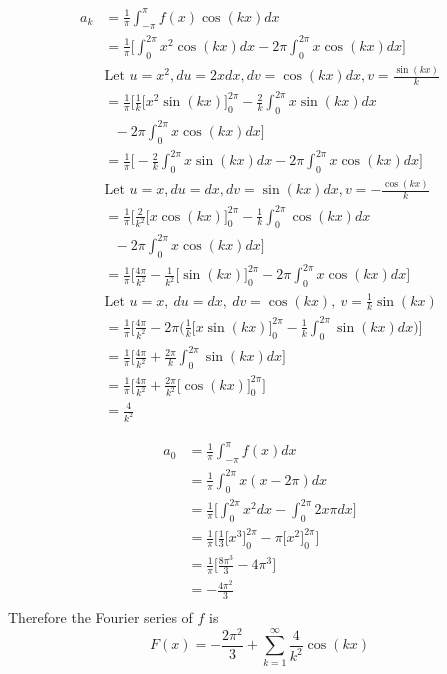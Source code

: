 \documentclass{article}
\begin{document}
\begin{enumerate}
\begin{multicols}{2}
\begin{align*}
    a_k &= \frac{1}{\pi} \int_{-\pi}^{\pi}f(x)\cos(kx) dx \\
    &= \frac{1}{\pi} \Bigg[\int_{0}^{2\pi} x^2\cos(kx) dx - 2\pi \int_{0}^{2\pi} x \cos(kx) dx \Bigg]\\
    &\text{Let $u = x^2, du = 2xdx, dv = \cos(kx) dx, v = \frac{\sin(kx)}{k}$} \\
    &= \frac{1}{\pi} \Bigg[\frac{1}{k}\Big[x^2\sin(kx)\Big]_{0}^{2\pi}  - \frac{2}{k}\int_{0}^{2\pi}x\sin(kx)dx  \\
    & \: \: \: - 2\pi\int_{0}^{2\pi} x \cos(kx) dx \Bigg]\\
    &= \frac{1}{\pi} \Bigg[- \frac{2}{k}\int_{0}^{2\pi}x\sin(kx)dx - 2\pi\int_{0}^{2\pi} x \cos(kx) dx \Bigg]\\
    &\text{Let $u = x, du = dx, dv = \sin(kx) dx, v = -\frac{\cos(kx)}{k}$} \\
    &= \frac{1}{\pi} \Bigg[ \frac{2}{k^2}\Big[x\cos(kx) \Big]_{0}^{2\pi} - \frac{1}{k}\int_{0}^{2\pi}\cos(kx)dx \\
    & \: \: \: - 2\pi\int_{0}^{2\pi} x \cos(kx) dx \Bigg]\\
    &= \frac{1}{\pi} \Bigg[ \frac{4\pi}{k^2} - \frac{1}{k^2} \Big[ \sin(kx) \Big]_{0}^{2\pi} - 2\pi\int_{0}^{2\pi} x \cos(kx) dx \Bigg]\\
    &\text{Let } u = x,\: du = dx,\: dv = \cos(kx),\: v = \frac{1}{k}\sin(kx) \\
    &= \frac{1}{\pi} \Bigg[ \frac{4\pi}{k^2} - 2\pi\Big(\frac{1}{k}\Big[ x\sin(kx)\Big]_{0}^{2\pi} - \frac{1}{k}\int_{0}^{2\pi}\sin(kx)dx \Big)\Bigg]\\
    &= \frac{1}{\pi} \Bigg[ \frac{4\pi}{k^2} + \frac{2\pi}{k}\int_{0}^{2\pi}\sin(kx)dx \Bigg]\\
    &= \frac{1}{\pi} \Bigg[ \frac{4\pi}{k^2} + \frac{2\pi}{k^2}\Big[ \cos(kx)\Big]_{0}^{2\pi}\Bigg]\\
    &= \frac{4}{k^2}
\end{align*} 
\end{multicols}
\begin{align*}
    a_0 &= \frac{1}{\pi} \int_{-\pi}^{\pi}f(x) dx \\
    &= \frac{1}{\pi} \int_{0}^{2\pi}x(x-2\pi)dx \\
    &= \frac{1}{\pi} \Bigg[ \int_{0}^{2\pi}x^2dx -\int_{0}^{2\pi}2x\pi dx \Bigg]\\
    &= \frac{1}{\pi} \Bigg[ \frac{1}{3}\Big[x^3\Big]_{0}^{2\pi} - \pi\Big[x^2 \Big]_{0}^{2\pi}\Bigg]\\
    &= \frac{1}{\pi} \Bigg[ \frac{8\pi^3}{3} - 4\pi^3 \Bigg]\\
    &= -\frac{4\pi^2}{3} \\
\end{align*} 
Therefore the Fourier series of $f$ is 
\[F(x) = -\frac{2\pi^2}{3} + \sum_{k=1}^{\infty} \frac{4}{k^2}\cos(kx) \]



\end{enumerate}
\end{document}
